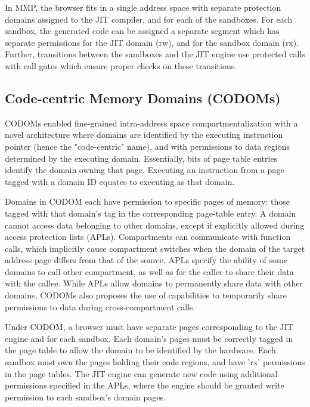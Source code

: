 In MMP, the browser fits in a single address space with separate protection 
domains assigned to the JIT compiler, and for each of the sandboxes.
For each sandbox, the generated code can be assigned a separate segment
which has separate permissions for the JIT domain (rw), and for the sandbox
domain (rx).
Further, transitions between the sandboxes and the JIT engine use protected
calls with call gates which ensure proper checks on these transitions.

\subsection{Code-centric Memory Domains (CODOMs)}
CODOMs enabled fine-grained intra-address space compartmentalization
with a novel architecture where domains are identified by the executing
instruction pointer (hence the "code-centric" name), and with permissions
to data regions determined by the executing domain. 
Essentially, bits of page table entries identify the domain owning that
page.
Executing an instruction from a page tagged with a domain ID equates to
executing as that domain.

Domains in CODOM each have permission to specific pages of memory: 
those tagged with that domain's tag in the corresponding page-table entry.
A domain cannot access data belonging to other domains, except if
explicitly allowed during access protection lists (APLs).
Compartments can communicate with function calls, which implicitly
cause compartment switches when the domain of the target address page
differs from that of the source.
APLs specify the ability of some domains to call other compartment,
as well as for the caller to share their data with the callee.
While APLs allow domains to permanently share data with other domains,
CODOMs also proposes the use of capabilities to temporarily share
permissions to data during cross-compartment calls.

Under CODOM, a browser must have separate pages corresponding to the
JIT engine and for each sandbox. 
Each domain's pages must be correctly tagged in the page table to allow
the domain to be identified by the hardware.
Each sandbox must own the pages holding their code regions, and have
'rx' permissions in the page tables. 
The JIT engine can generate new code using additional permissions specified
in the APLs, where the engine should be granted write permission to
each sandbox's domain pages.

